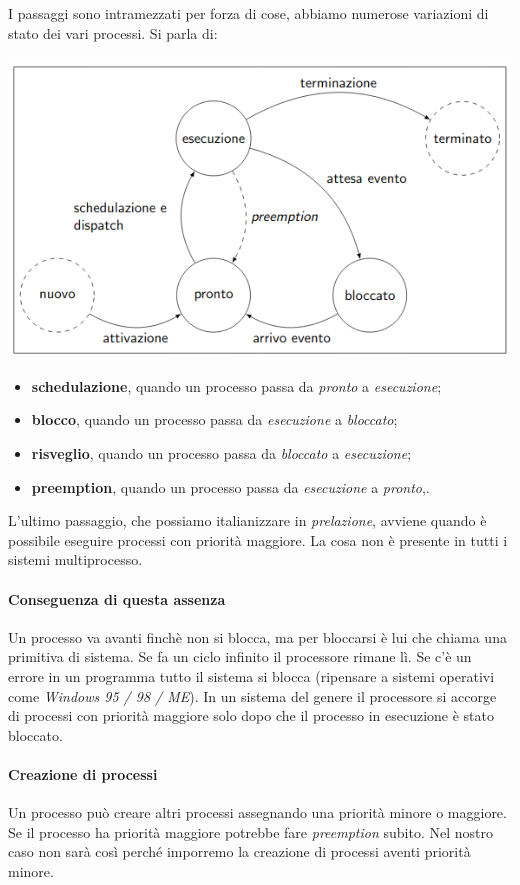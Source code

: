 I passaggi sono intramezzati per forza di cose, abbiamo numerose variazioni di stato dei vari processi. Si parla di:
\begin{center}\includegraphics[scale=.76]{img/198.PNG}\end{center}
\begin{itemize}
	\item \textbf{schedulazione}, quando un processo passa da \emph{pronto} a \emph{esecuzione};
	\item \textbf{blocco}, quando un processo passa da \emph{esecuzione} a \emph{bloccato};
	\item \textbf{risveglio}, quando un processo passa da \emph{bloccato} a \emph{esecuzione};
	\item \textbf{preemption}, quando un processo passa da \emph{esecuzione} a \emph{pronto},.
\end{itemize}
L'ultimo passaggio, che possiamo italianizzare in \emph{prelazione}, avviene quando è possibile eseguire processi con priorità maggiore. La cosa non è presente in tutti i sistemi multiprocesso.
\paragraph{Conseguenza di questa assenza}  Un processo va avanti finchè non si blocca, ma per bloccarsi è lui che chiama una primitiva di sistema. Se fa un ciclo infinito il processore rimane lì. Se c'è un errore in un programma  tutto il sistema si blocca (ripensare a sistemi operativi come \emph{Windows 95 / 98 / ME}). In un sistema del genere il processore si accorge di processi con priorità maggiore solo dopo che il processo in esecuzione è stato bloccato.
\paragraph{Creazione di processi} Un processo può creare altri processi assegnando una priorità minore o maggiore. Se il processo ha priorità maggiore potrebbe fare \emph{preemption} subito. Nel nostro caso non sarà così perché imporremo la creazione di processi aventi priorità minore.
